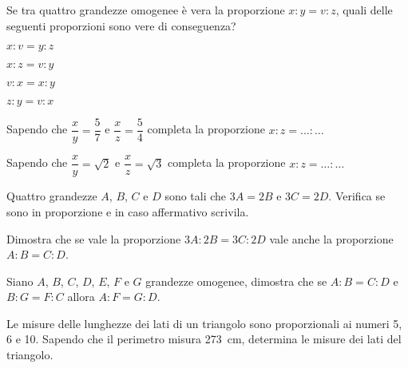\begin{multicols}{2}

\begin{esercizio}
\label{ese:6.13}
Se tra quattro grandezze omogenee è vera la proporzione \(x : y = v : 
z\), quali delle seguenti proporzioni sono vere di conseguenza?
\begin{enumeratea}
\item \(x : v = y : z\)
\item \(x : z = v : y\)
\item \(v : x = x : y\)
\item \(z : y = v : x\)
\end{enumeratea}
\end{esercizio}

\begin{esercizio}
\label{ese:6.14}
Sapendo che \(\dfrac{x}{y}=\dfrac{5}{7}\) e \(\dfrac{x}{z}=\dfrac{5}{4}\) 
completa la proporzione \(x : z = \ldots{} : \ldots{}\)
\end{esercizio}

\begin{esercizio}
\label{ese:6.15}
Sapendo che \(\dfrac{x}{y}=\sqrt{2}\) e \(\dfrac{x}{z}=\sqrt{3}\) 
completa la proporzione \(x : z = \ldots{} : \ldots{}\)
\end{esercizio}

\begin{esercizio}
\label{ese:6.16}
Quattro grandezze \(A\), \(B\), \(C\) e \(D\) sono tali che \(3A=2B\) e 
\(3C=2D\). Verifica se sono in proporzione e in caso affermativo 
scrivila.
\end{esercizio}

\begin{esercizio}
\label{ese:6.17}
Dimostra che se vale la proporzione \(3A : 2B = 3C : 2D\) vale anche la 
proporzione \(A : B = C : D\).
\end{esercizio}

\begin{esercizio}
\label{ese:6.18}
Siano \(A\), \(B\), \(C\), \(D\), \(E\), \(F\) e \(G\) grandezze omogenee, dimostra 
che se \(A : B = C : D\) e \(B : G = F : C\) allora \(A : F = G : D\).
\end{esercizio}

\begin{esercizio}
\label{ese:6.19}
Le misure delle lunghezze dei lati di un triangolo sono proporzionali 
ai numeri 5, 6 e 10. Sapendo che il perimetro misura 273~cm, 
determina le misure dei lati del triangolo.
\end{esercizio}


\end{multicols}
